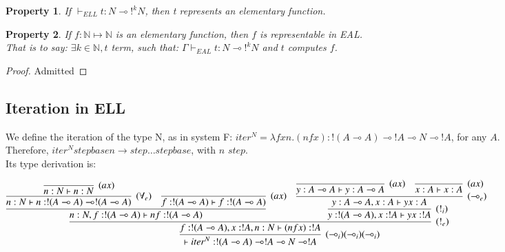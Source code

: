 \documentclass[a4paper,10pt]{article}
\newcommand{\limpl}{\multimap}  %
\newcommand{\Nset}{\mathbb{N}} %
\newtheorem{prop}{Property}
\begin{document}
\begin{prop}
If $\vdash_{ELL} t:N \limpl !^{k} N$, then t represents an elementary function.
\end{prop}

\begin{prop}
	If $f: \Nset \mapsto \Nset$ is an elementary function, then $f$ is representable in EAL.\\
	That is to say: $\exists k \in \Nset, t$ term, such that: $\Gamma \vdash_{EAL} t: N \limpl !^{k} N$ and $t$ computes $f$.
\end{prop}
\begin{proof}
	Admitted
\end{proof}


\subsection{Iteration in ELL}

 We define the iteration of the type N, as in system F: $iter^N = \lambda f x n. (n f x) : !(A \limpl A) \limpl !A \limpl N \limpl !A$, for any $A$.\\
Therefore, $iter^N step base n \rightarrow step \dots step base$, with $n$ $step$.\\
Its type derivation is:
\begin{center}
$	\infer[(\limpl_i) (\limpl_i) (\limpl_i)]{\vdash iter^N: !(A \limpl A) \limpl !A \limpl N \limpl !A}{
		\infer[(!_e)]{f:!(A \limpl A), x:!A, n:N \vdash (n f x): !A}{
			\infer{n:N, f:!(A \limpl A) \vdash n f: !(A \limpl A)}{
				\infer[(\forall_e)]{n:N \vdash n: !(A\limpl A) \limpl !(A \limpl A)}{
					\infer[(ax)]{n:N \vdash n:N}{}
				}
				&
				\infer[(ax)]{f:!(A\limpl A) \vdash f:!(A\limpl A)}{}
			}
			&
			\infer[(!_i)]{y:!(A\limpl A), x:!A \vdash y x:!A}{
				\infer[(\limpl_e)]{y:A\limpl A, x:A \vdash y x:A}{
					\infer[(ax)]{y:A\limpl A \vdash y:A \limpl A}{}
					&
					\infer[(ax)]{x:A \vdash x:A}{}
				}
			}
		}
	}$
\end{center}
\end{document}
